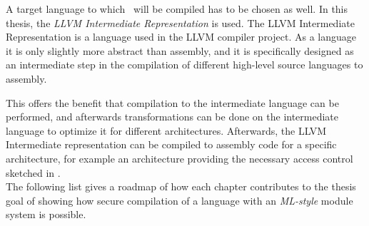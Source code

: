 A target language to which \MiniML\ will be compiled has to be chosen as well.
In this thesis, the \emph{LLVM Intermediate Representation} is used.
The LLVM Intermediate Representation is a language used in the LLVM compiler project.
As a language it is only slightly more abstract than assembly, and it is specifically designed as an intermediate step in the compilation of different high-level source languages to assembly.

This offers the benefit that compilation to the intermediate language can be performed, and afterwards transformations can be done on the intermediate language to optimize it for different architectures.
Afterwards, the LLVM Intermediate representation can be compiled to assembly code for a specific architecture, for example an architecture providing the necessary access control sketched in .
\\[1em]
The following list gives a roadmap of how each chapter contributes to the thesis goal of showing how secure compilation of a language with an \emph{ML-style} module system is possible.

